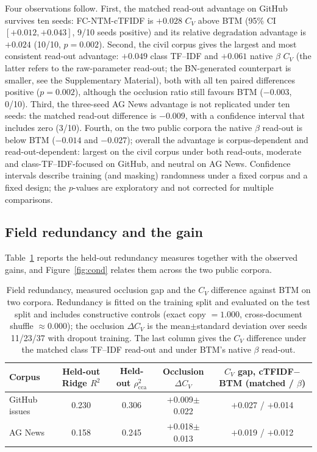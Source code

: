 \documentclass[11pt]{article}
\newcommand{\fcntm}{FC-NTM}
\begin{document}
Four observations follow. First, the matched read-out advantage on GitHub survives ten seeds:
\fcntm{}-cTFIDF is $+0.028$ $C_V$ above BTM (95\% CI $[+0.012,+0.043]$, 9/10 seeds positive) and
its relative degradation advantage is $+0.024$ (10/10, $p=0.002$). Second, the civil corpus gives
the largest and most consistent read-out advantage: $+0.049$ class TF--IDF and $+0.061$ native
$\beta$ $C_V$ (the latter refers to the raw-parameter read-out; the BN-generated counterpart
is smaller, see the Supplementary Material), both with all ten paired differences positive
($p=0.002$), although the occlusion
ratio still favours BTM ($-0.003$, 0/10). Third, the three-seed AG News advantage is not replicated under ten seeds: the matched read-out difference is $-0.009$, with a confidence interval that includes zero (3/10). Fourth, on the
two public corpora the native $\beta$ read-out is below BTM ($-0.014$ and $-0.027$); overall the
advantage is corpus-dependent and read-out-dependent: largest on the civil corpus under both
read-outs, moderate and class-TF--IDF-focused on GitHub, and neutral on AG News. Confidence intervals
describe training (and masking) randomness under a fixed corpus and a fixed design; the $p$-values
are exploratory and not corrected for multiple comparisons.

\subsection{Field redundancy and the gain}

Table~\ref{tab:conditional} reports the held-out redundancy measures together with the observed
gains, and Figure~\ref{fig:cond} relates them across the two public corpora.

\begin{table}[t]
\centering
\caption{Field redundancy, measured occlusion gap and the $C_V$ difference against BTM on two corpora. Redundancy is fitted on the training split and evaluated on the test split and includes constructive controls (exact copy $=1.000$, cross-document shuffle $\approx0.000$); the occlusion $\Delta C_V$ is the mean$\pm$standard deviation over seeds 11/23/37 with dropout training. The last column gives the $C_V$ difference under the matched class TF--IDF read-out and under BTM's native $\beta$ read-out.}
\label{tab:conditional}
\footnotesize
\setlength{\tabcolsep}{4pt}
\begin{tabular}{@{}lcccc@{}}
\toprule
Corpus & Held-out Ridge $R^2$ & Held-out $\rho^2_{\mathrm{cca}}$
 & Occlusion $\Delta C_V$ & $C_V$ gap, cTFIDF$-$BTM (matched / $\beta$) \\
\midrule
GitHub issues & 0.230 & 0.306 & $+$0.009$\pm$0.022 & $+$0.027 / $+$0.014 \\
AG News & 0.158 & 0.245 & $+$0.018$\pm$0.013 & $+$0.019 / $+$0.012 \\
\bottomrule
\end{tabular}
\end{table}
\end{document}
